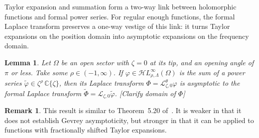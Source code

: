 \documentclass{article}
\newcommand{\singexp}[2]{\mathcal{H}L^\infty_{#1, #2}}
\newcommand{\C}{\mathbb{C}}
\newcommand{\series}[1]{\tilde{#1}}
\newcommand{\laplace}{\mathcal{L}}
\theoremstyle{definition}
\newtheorem{remark}[definition]{Remark}
\theoremstyle{plain}
\newtheorem{lemma}[definition]{Lemma}
\newenvironment{todo}{\color{Coral}}{\color{black}}
\begin{document}
Taylor expansion and summation form a two-way link between holomorphic functions and formal power series. For regular enough functions, the formal Laplace transform preserves a one-way vestige of this link: it turns Taylor expansions on the position domain into asymptotic expansions on the frequency domain.
\begin{lemma}\label{lem:laplace-bridge}
Let $\Omega$ be an open sector with $\zeta = 0$ at its tip, and an opening angle of $\pi$ or less. Take some $\rho \in (-1,\infty)$. If $\varphi \in \singexp{\rho}{\Lambda}(\Omega)$ is the sum of a power series $\series{\varphi} \in \zeta^\rho\,\C\{\zeta\}$, then its Laplace transform $\Phi = \laplace_{\zeta, 0}^\theta \varphi$ is asymptotic to the formal Laplace transform $\series{\Phi} = \laplace_{\zeta, 0} \series{\varphi}$. \begin{todo}[Clarify domain of $\Phi$]\end{todo}
\end{lemma}
\begin{remark}
This result is similar to Theorem~5.20 of~\cite{diverg-resurg-i}. It is weaker in that it does not establish Gevrey asymptoticity, but stronger in that it can be applied to functions with fractionally shifted Taylor expansions.
\end{remark}
\end{document}
